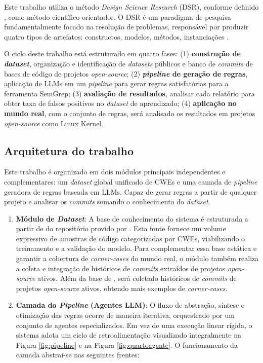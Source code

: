 \documentclass[
    12pt,                %
    openright,           %
    oneside,             %
    a4paper,             %
    english,             %
    brazil               %
]{abntex2}
\begin{document}
\begin{itemize}
\par
Este trabalho utiliza o método \textit{Design Science Research} (DSR), conforme definido , como método científico orientador.
O DSR é um paradigma de pesquisa fundamentalmente focado na resolução de problemas, responsável por produzir quatro tipos de artefatos: constructos, modelos, métodos, instanciações \cite{hevner2004design}.
\par
O ciclo deste trabalho está estruturado em quatro fases:
(1) \textbf{construção de \textit{dataset}}, organização e identificação de \textit{datasets} públicos e banco de \textit{commits} de bases de código de projetos \textit{open-source};
(2) \textbf{\textit{pipeline} de geração de regras}, aplicação de LLMs em um \textit{pipeline} para gerar regras satisfatórias para a ferramenta SemGrep;
(3) \textbf{avaliação de resultados}, analisar cada relatório para obter taxa de falsos positivos no \textit{dataset} de aprendizado;
(4) \textbf{aplicação no mundo real}, com o conjunto de regras, será analisado os resultados em projetos \textit{open-source} como Linux Kernel.



\subsection{Arquitetura do trabalho}
\label{sec:arquitetura}
\par
Este trabalho é organizado em dois módulos principais independentes e complementares: um \textit{dataset} global unificado de CWEs e uma camada de \textit{pipeline} geradora de regras baseada em LLMs.
Capaz de gerar regras a partir de qualquer projeto e analisar os \textit{commits} somando o conhecimento do \textit{dataset}.
\begin{enumerate}
  \item \textbf{Módulo de \textit{Dataset}}:
    A base de conhecimento do sistema é estruturada a partir de do repositório provido por .
Esta fonte fornece um volume expressivo de amostras de código categorizadas por CWEs, viabilizando o treinamento e a validação do modelo.
Para complementar essa base estática e garantir a cobertura de \textit{corner-cases} do mundo real, o módulo também realiza a coleta e integração de históricos de \textit{commits} extraídos de projetos \textit{open-source} ativos.
Além da base de , será coletado históricos de \textit{commits} de projetos \textit{open-source} ativos, obtendo mais exemplos de \textit{corner-cases}.
\item \textbf{Camada do \textit{Pipeline} (Agentes LLM)}: 
  O fluxo de abstração, síntese e otimização das regras ocorre de maneira iterativa, orquestrado por um conjunto de agentes especializados.
  Em vez de uma execução linear rígida, o sistema adota um ciclo de retroalimentação visualizado integralmente na Figura \ref{fig:pipeline} e na Figura \ref{fig:quartoagente}.
  O funcionamento da camada abstrai-se nas seguintes frentes:


\end{enumerate}
\end{itemize}
\end{document}

